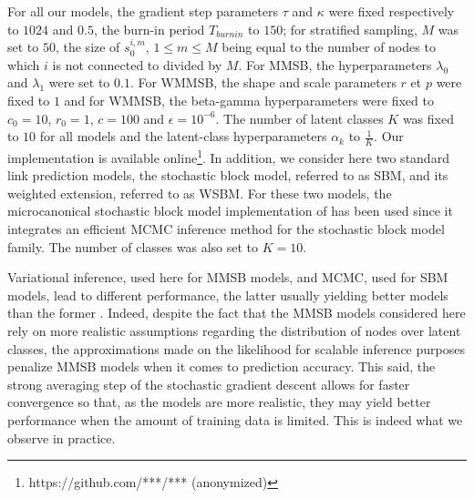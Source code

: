 For all our models, the gradient step parameters  $\tau$ and $\kappa$ were fixed respectively to  $1024$ and $0.5$, the burn-in period $T_{burnin}$ to $150$; for stratified sampling, $M$ was set to $50$, the size of $s_0^{i,m}, \, 1 \le m \le M$ being equal to the number of nodes to which $i$ is not connected to divided by $M$. For MMSB, the hyperparameters $\lambda_0$ and $\lambda_1$ were set to $0.1$. For WMMSB, the shape and scale parameters $r$ et $p$ were fixed to $1$ and for WMMSB, the beta-gamma hyperparameters were fixed to  $c_0=10$, $r_0=1$, $c=100$ and $\epsilon=10^{-6}$. The number of latent classes $K$ was fixed to $10$ for all models and the latent-class hyperparameters $\alpha_k$ to $\frac{1}{K}$. Our implementation is available online\footnote{https://github.com/***/*** (anonymized)}. In addition, we consider here two standard link prediction models, the stochastic block model, referred to as SBM, and its weighted extension, referred to as WSBM. For these two models, the microcanonical stochastic block model implementation of \cite{peixoto2018nonparametric} has been used since it integrates an efficient MCMC inference method for the stochastic block model family.  The number of classes was also set to $K=10$.

Variational inference, used here for MMSB models, and MCMC, used for SBM models, lead to different performance, the latter usually yielding better models than the former \cite{asuncion2009smoothing}. Indeed, despite the fact that the MMSB models considered here rely on more realistic assumptions regarding the distribution of nodes over latent classes, the approximations made on the likelihood for scalable inference purposes penalize MMSB models when it comes to prediction accuracy. This said, the strong averaging step of the stochastic gradient descent allows for faster convergence so that, as the models are more realistic, they may yield better performance when the amount of training data is limited. This is indeed what we observe in practice.


